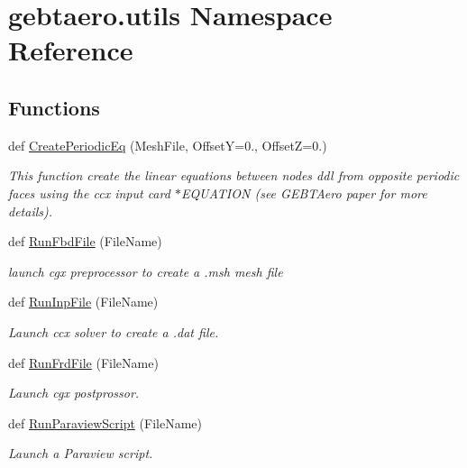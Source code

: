 \hypertarget{namespacegebtaero_1_1utils}{}\section{gebtaero.\+utils Namespace Reference}
\label{namespacegebtaero_1_1utils}
\subsection*{Functions}
\begin{DoxyCompactItemize}
\item 
def \hyperlink{namespacegebtaero_1_1utils_a4f786ecbe66af9f64c802adf4e0a990f}{Create\+Periodic\+Eq} (Mesh\+File, OffsetY=0., OffsetZ=0.)
\begin{DoxyCompactList}\small\item\em This function create the linear equations between nodes ddl from opposite periodic faces using the ccx input card $\ast$\+E\+Q\+U\+A\+T\+I\+ON (see G\+E\+B\+T\+Aero paper for more details). \end{DoxyCompactList}\item 
def \hyperlink{namespacegebtaero_1_1utils_a37d973efabdd0beca6418265ffa57d32}{Run\+Fbd\+File} (File\+Name)
\begin{DoxyCompactList}\small\item\em launch cgx preprocessor to create a .msh mesh file \end{DoxyCompactList}\item 
def \hyperlink{namespacegebtaero_1_1utils_a74be96ae0691643c4e6c459e14360464}{Run\+Inp\+File} (File\+Name)
\begin{DoxyCompactList}\small\item\em Launch ccx solver to create a .dat file. \end{DoxyCompactList}\item 
def \hyperlink{namespacegebtaero_1_1utils_a553253bef10c3bec37dc0d858b03dc71}{Run\+Frd\+File} (File\+Name)
\begin{DoxyCompactList}\small\item\em Launch cgx postprossor. \end{DoxyCompactList}\item 
def \hyperlink{namespacegebtaero_1_1utils_a248e0abbec4c02bcb7e75fea0f400c25}{Run\+Paraview\+Script} (File\+Name)
\begin{DoxyCompactList}\small\item\em Launch a Paraview script. \end{DoxyCompactList}\item 

\end{DoxyCompactItemize}
